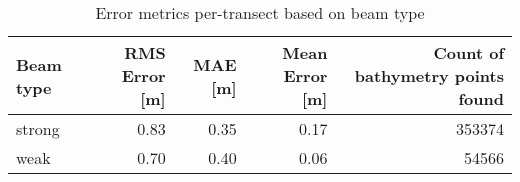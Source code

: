 \begin{table}[htbp]
\centering
\caption{Error metrics per-transect based on beam type}
\label{tab:error-by-strongweak}
\begin{tabular}{lrrrr}
\toprule
Beam type & RMS Error [m] & MAE [m] & Mean Error [m] & Count of bathymetry points found \\
\midrule
strong & 0.83 & 0.35 & 0.17 & 353374 \\
weak & 0.70 & 0.40 & 0.06 & 54566 \\
\bottomrule
\end{tabular}
\end{table}
